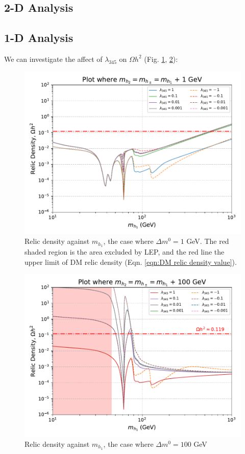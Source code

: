 \documentclass[12pt]{article}
\begin{document}
\subsection{2-D Analysis}
\label{2-D scan}

\subsection{1-D Analysis}
\label{1-D scan}
We can investigate the affect of $\lambda_{345}$ on $\Omega h^2$ (Fig. \ref{fig:MD1_l345_1}, \ref{fig:MD1_l345_100}):
\begin{figure}[H]
    \centering
    \includegraphics[width=\columnwidth]{scans/1-D_scans/Omegah2_MD1_l345_+1/plot_MD1_l345.pdf}
    \caption{Relic density against $m_{h_1}$, the case where $\Delta m^0 = 1$ GeV. The red shaded region is the area excluded by LEP, and the red line the upper limit of DM relic density (Eqn. \ref{eqn:DM relic density value}).}
    \label{fig:MD1_l345_1}
\end{figure}

\begin{figure}[H]
    \centering
    \includegraphics[width=\columnwidth]{plots/plot_MD1_l345+100.pdf}
    \caption{Relic density against $m_{h_1}$, the case where $\Delta m^0 = 100$ GeV}
    \label{fig:MD1_l345_100}
\end{figure}
\end{document}
